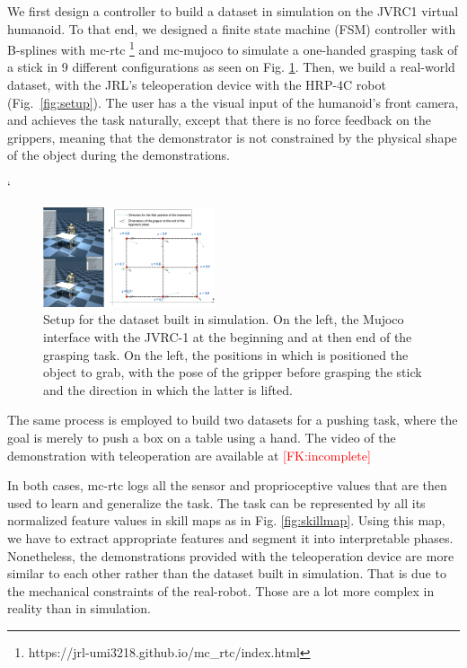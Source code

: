 \documentclass[conference]{IEEEtran}
\newcommand{\fk}[1]{\textcolor{red}{[FK:#1]}}
\begin{document}
 We first design a controller to build a dataset in  simulation on the JVRC1 virtual humanoid. To that end, we designed a finite state machine (FSM) controller with B-splines with mc-rtc \footnote{https://jrl-umi3218.github.io/mc\_rtc/index.html} and mc-mujoco \cite{singh2023mc} to simulate a one-handed grasping task of a stick in 9 different configurations as seen on Fig. \ref{fig:simSetup}. Then, we build a real-world dataset, with the JRL's teleoperation device  with the HRP-4C robot (Fig.~\ref{fig:setup}). The user has a the visual input of the humanoid's front camera, and achieves the task naturally, except that there is no force  feedback on the grippers, meaning that the demonstrator is not constrained by the physical shape of the object during the demonstrations.

 `\begin{figure}[ht]
  \centering
  \includegraphics[width=0.45\textwidth]{img/simSetup4.png}
  \caption{Setup for the dataset built in simulation. On the left, the Mujoco interface with the JVRC-1 \cite{jvrc} at the beginning and at then end of the grasping task. On the left, the positions in which is positioned the object to grab, with the pose of the gripper before grasping the stick and the direction in which the latter is lifted.}
  \label{fig:simSetup}
\end{figure}

 The same process is employed to build two datasets for a pushing task, where the goal is merely to push a box on a table using a hand. The video of the demonstration with teleoperation are available at \fk{incomplete}

 In both cases, mc-rtc logs all the sensor and proprioceptive values that are then used to learn and generalize the task. The task can be represented by all its normalized feature values in skill maps as in Fig. \ref{fig:skillmap}. Using this map, we have to extract appropriate features and segment it into interpretable phases. Nonetheless, the demonstrations provided with the teleoperation device are more similar to each other rather than the dataset built in simulation. That is due to the mechanical constraints of the real-robot. Those are a lot more complex in reality than in simulation.
\end{document}
